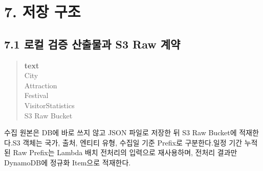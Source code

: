\documentclass[12pt,a4paper]{article}
\newcommand{\DocNeedspace}[1]{\par\ifdim\dimexpr\pagegoal-\pagetotal\relax<#1\newpage\fi}
\begin{document}
\newpage

\DocNeedspace{10\baselineskip}
\section*{7. 저장 구조}


\DocNeedspace{8\baselineskip}
\subsection*{7.1 로컬 검증 산출물과 S3 Raw 계약}


\DocNeedspace{7\baselineskip}
\begin{quote}
\begin{scriptsize}
\ttfamily
\RaggedRight
\setlength{\parskip}{1pt}
\textcolor{LovvGreen}{\textbf{text}}\\[0.2em]
City\\
Attraction\\
Festival\\
Visitor\allowbreak{}Statistics\\
S3 Raw Bucket\\
\end{scriptsize}
\end{quote}


\DocNeedspace{3\baselineskip}
수집 원본은 DB에 바로 쓰지 않고 JSON 파일로 저장한 뒤 S3 Raw Bucket에 적재한다.\newline S3 객체는 국가, 출처, 엔티티 유형, 수집일 기준 Prefix로 구분한다.\newline 일정 기간 누적된 Raw Prefix는 Lambda 배치 전처리의 입력으로 재사용하며, 전처리 결과만 DynamoDB에 정규화 Item으로 적재한다.
\end{document}
